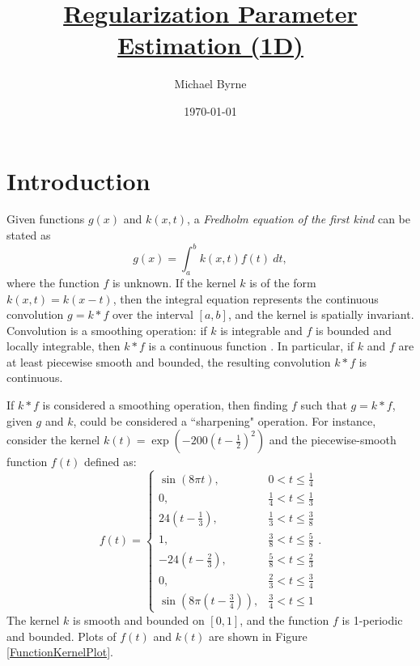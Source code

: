\documentclass[12pt]{article}
\title{\underline{Regularization Parameter Estimation (1D)}}
\author{Michael Byrne}
\date{\today}
\newcommand{\gcon}{g}
\newcommand{\kcon}{k}
\newcommand{\fcon}{f}
\begin{document}
\maketitle

\section{Introduction} \label{sec:Introduction}
Given functions $\gcon(x)$ and $\kcon(x,t)$, a \textit{Fredholm equation of the first kind} can be stated as
\begin{equation}
	\gcon(x) = \int_a^b \kcon(x,t)\fcon(t)\:dt,
	\label{eq:Con}
\end{equation}
where the function $\fcon$ is unknown. If the kernel $\kcon$ is of the form $\kcon(x,t) = \kcon(x-t)$, then the integral equation represents the continuous convolution $\gcon = \kcon * \fcon$ over the interval $[a,b]$, and the kernel is spatially invariant. Convolution is a smoothing operation: if $\kcon$ is integrable and $\fcon$ is bounded and locally integrable, then $\kcon * \fcon$ is a continuous function \cite{DebnathLokenath1999ItHs}. In particular, if $\kcon$ and $\fcon$ are at least piecewise smooth and bounded, the resulting convolution $\kcon * \fcon$ is continuous. \par
If $\kcon * \fcon$ is considered a smoothing operation, then finding $\fcon$ such that $\gcon = \kcon * \fcon$, given $\gcon$ and $\kcon$, could be considered a ``sharpening" operation. For instance, consider the kernel $\kcon(t) = \exp(-200(t-\frac{1}{2})^2)$ and the piecewise-smooth function $\fcon(t)$ defined as:
\begin{equation}
\fcon(t) = \begin{cases}
\sin\left(8\pi{t}\right), & 0 < t \leq \frac{1}{4} \\
0, & \frac{1}{4} < t \leq \frac{1}{3} \\
24\left(t-\frac{1}{3}\right), & \frac{1}{3} < t \leq \frac{3}{8} \\
1, & \frac{3}{8} < t \leq \frac{5}{8} \\
-24\left(t-\frac{2}{3}\right), & \frac{5}{8} < t \leq \frac{2}{3} \\
0, & \frac{2}{3} < t \leq \frac{3}{4} \\
\sin\left(8\pi\left(t-\frac{3}{4}\right)\right), & \frac{3}{4} < t \leq 1
\end{cases}.
\label{eq:Test Function 2}
\end{equation}
The kernel $\kcon$ is smooth and bounded on $[0,1]$, and the function $\fcon$ is 1-periodic and bounded. Plots of $\fcon(t)$ and $\kcon(t)$ are shown in Figure \ref{FunctionKernelPlot}. \par
\end{document}
